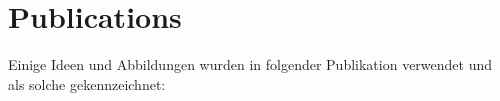 \chapter*{Publications}
Einige Ideen und Abbildungen wurden in folgender Publikation verwendet und als solche gekennzeichnet:

\bigskip

\noindent {}